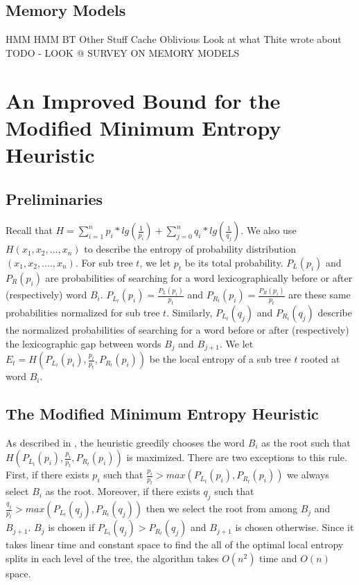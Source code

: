 \documentclass[letterpaper,12pt,titlepage,oneside,final]{book}
\theoremstyle{plain}
\begin{document}
\section{Memory Models}

HMM
HMM BT
Other Stuff
Cache Oblivious
Look at what Thite wrote about
TODO - LOOK @ SURVEY ON MEMORY MODELS


\chapter{An Improved Bound for the Modified Minimum Entropy Heuristic}

\section{Preliminaries}

Recall that $H = \sum_{i=1}^{n} p_i*lg(\frac{1}{p_i}) + \sum_{j=0}^{n} q_i*lg(\frac{1}{q_j})$. We also use $H(x_1,x_2,...,x_n)$ to describe the entropy of probability distribution $(x_1, x_2, ...., x_n)$. For sub tree $t$, we let $p_t$ be its total probability. $P_{L}(p_i)$ and $P_{R}(p_i)$ are probabilities of searching for a word lexicographically before or after (respectively) word $B_i$. $P_{L_t}(p_i)=\frac{P_L(p_i)}{p_t}$ and $P_{R_t}(p_i)=\frac{P_R(p_i)}{p_t}$ are these same probabilities normalized for sub tree $t$. Similarly, $P_{L_t}(q_j)$ and $P_{R_t}(q_j)$ describe the normalized probabilities of searching for a word before or after (respectively) the lexicographic gap between words $B_j$ and $B_{j+1}$. We let $E_t=H(P_{L_t}(p_i), \frac{p_i}{p_t}, P_{R_t}(p_i))$ be the local entropy of a sub tree $t$ rooted at word $B_i$.  

\section{The Modified Minimum Entropy Heuristic}

As described in \cite{guttler1980binary}, the heuristic greedily chooses the word $B_i$ as the root such that $H(P_{L_t}(p_i), \frac{p_i}{p_t}, P_{R_t}(p_i))$ is maximized. There are two exceptions to this rule. First, if there exists $p_i$ such that $\frac{p_i}{p_t} > max(P_{L_t}(p_i), P_{R_t}(p_i))$ we always select $B_i$ as the root. Moreover, if there exists $q_j$ such that $\frac{q_j}{p_t} > max(P_{L_t}(q_j), P_{R_t}(q_j))$ then we select the root from among $B_j$ and $B_{j+1}$. $B_j$ is chosen if $P_{L_t}(q_j) > P_{R_t}(q_j)$ and $B_{j+1}$ is chosen otherwise. Since it takes linear time and constant space to find the all of the optimal local entropy splits in each level of the tree, the algorithm takes $O(n^2)$ time and $O(n)$ space.  \\
\end{document}
